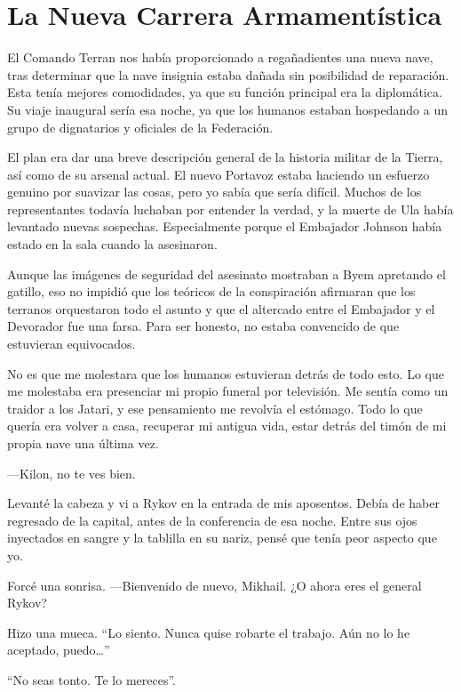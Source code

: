 \chapter{La Nueva Carrera Armamentística}\label{sec:la-nueva-carrera-armamentistica}

El Comando Terran nos había proporcionado a regañadientes una nueva nave, tras determinar que la nave insignia estaba dañada sin posibilidad de reparación. Esta tenía mejores comodidades, ya que su función principal era la diplomática. Su viaje inaugural sería esa noche, ya que los humanos estaban hospedando a un grupo de dignatarios y oficiales de la Federación.

El plan era dar una breve descripción general de la historia militar de la Tierra, así como de su arsenal actual. El nuevo Portavoz estaba haciendo un esfuerzo genuino por suavizar las cosas, pero yo sabía que sería difícil. Muchos de los representantes todavía luchaban por entender la verdad, y la muerte de Ula había levantado nuevas sospechas. Especialmente porque el Embajador Johnson había estado en la sala cuando la asesinaron.

Aunque las imágenes de seguridad del asesinato mostraban a Byem apretando el gatillo, eso no impidió que los teóricos de la conspiración afirmaran que los terranos orquestaron todo el asunto y que el altercado entre el Embajador y el Devorador fue una farsa. Para ser honesto, no estaba convencido de que estuvieran equivocados.

No es que me molestara que los humanos estuvieran detrás de todo esto. Lo que me molestaba era presenciar mi propio funeral por televisión. Me sentía como un traidor a los Jatari, y ese pensamiento me revolvía el estómago. Todo lo que quería era volver a casa, recuperar mi antigua vida, estar detrás del timón de mi propia nave una última vez.

—Kilon, no te ves bien.

Levanté la cabeza y vi a Rykov en la entrada de mis aposentos. Debía de haber regresado de la capital, antes de la conferencia de esa noche. Entre sus ojos inyectados en sangre y la tablilla en su nariz, pensé que tenía peor aspecto que yo.

Forcé una sonrisa. —Bienvenido de nuevo, Mikhail. ¿O ahora eres el general Rykov?

Hizo una mueca. ``Lo siento. Nunca quise robarte el trabajo. Aún no lo he aceptado, puedo…''


``No seas tonto. Te lo mereces''.

